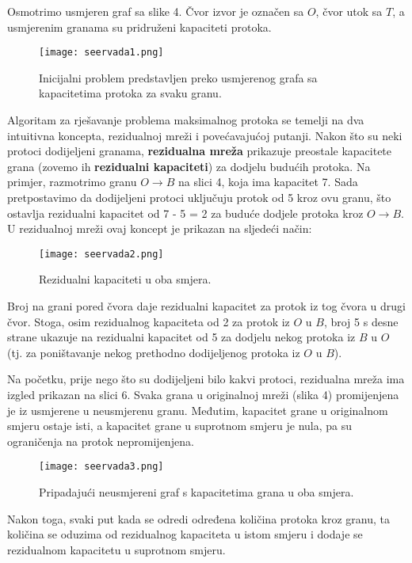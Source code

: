 \documentclass[11pt, a4paper]{article}
\begin{document}
	Osmotrimo usmjeren graf sa slike 4. Čvor izvor je označen sa $O$, čvor utok sa $T$, a usmjerenim granama su pridruženi kapaciteti protoka.
	\begin{figure}[h]
		\centering
		\texttt{[image: seervada1.png]}
		\caption{Inicijalni problem predstavljen preko usmjerenog grafa sa kapacitetima protoka za svaku granu.}
		\label{fig:slika4}
	\end{figure}
	
	Algoritam za rješavanje problema maksimalnog protoka se temelji na dva intuitivna koncepta, rezidualnoj mreži i povećavajućoj putanji. Nakon što su neki protoci dodijeljeni granama, \textbf{rezidualna mreža} prikazuje preostale kapacitete grana (zovemo ih \textbf{rezidualni kapaciteti}) za dodjelu budućih protoka. Na primjer, razmotrimo granu $O \rightarrow B$ na slici 4, koja ima kapacitet 7. Sada pretpostavimo da dodijeljeni protoci uključuju protok od 5 kroz ovu granu, što ostavlja rezidualni kapacitet od 7 - 5 = 2 za buduće dodjele protoka kroz $O \to B$. U rezidualnoj mreži ovaj koncept je prikazan na sljedeći način:
	
	\begin{figure}[h]
		\centering
		\texttt{[image: seervada2.png]}
		\caption{Rezidualni kapaciteti u oba smjera.}
		\label{slika5}
	\end{figure}
	
	Broj na grani pored čvora daje rezidualni kapacitet za protok iz tog čvora u drugi čvor. Stoga, osim rezidualnog kapaciteta od 2 za protok iz $O$ u $B$, broj 5 s desne strane ukazuje na rezidualni kapacitet od 5 za dodjelu nekog protoka iz $B$ u $O$ (tj. za poništavanje nekog prethodno dodijeljenog protoka iz $O$ u $B$).
	
	Na početku, prije nego što su dodijeljeni bilo kakvi protoci, rezidualna mreža ima izgled prikazan na slici 6. Svaka grana u originalnoj mreži (slika 4) promijenjena je iz usmjerene u neusmjerenu granu. Međutim, kapacitet grane u originalnom smjeru ostaje isti, a kapacitet grane u suprotnom smjeru je nula, pa su ograničenja na protok nepromijenjena.
	
	\begin{figure}[h]
		\centering
		\texttt{[image: seervada3.png]}
		\caption{Pripadajući neusmjereni graf s kapacitetima grana u oba smjera.}
		\label{fig:slika6}
	\end{figure}
	
	Nakon toga, svaki put kada se odredi određena količina protoka kroz granu, ta količina se oduzima od rezidualnog kapaciteta u istom smjeru i dodaje se rezidualnom kapacitetu u suprotnom smjeru.
	
\end{document}

